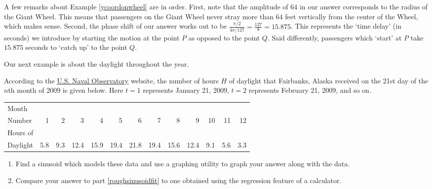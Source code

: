 A few remarks about Example \ref{ycoordonwheel} are in order.  First, note that the amplitude of $64$ in our answer corresponds to the radius of the Giant Wheel.  This means that passengers on the Giant Wheel never stray more than $64$ feet vertically from the center of the Wheel, which makes sense.  Second, the phase shift of our answer works out to be $\frac{\pi/2}{4\pi/127} = \frac{127}{8} = 15.875$.  This represents the `time delay' (in seconds) we introduce by starting the motion at the point $P$ as opposed to the point $Q$.  Said differently, passengers which `start' at $P$ take  $15.875$ seconds to `catch up' to the point $Q$.  

\medskip

Our next example is about the daylight throughout the year.

\begin{ex} \label{sinusoidsunlight} According to the \href{http://aa.usno.navy.mil/data/docs/RS_OneYear.php}{\underline{U.S. Naval Observatory}} website, the number of hours $H$ of daylight that Fairbanks, Alaska received on the 21st day of the $n$th month of 2009 is given below.  Here  $t = 1$ represents January 21, 2009, $t = 2$ represents February 21, 2009, and so on.  

\medskip

\small

\noindent \begin{tabular}{|l|r|r|r|r|r|r|r|r|r|r|r|r|} \hline
Month  & & & & & & & & & & & & \\
Number & 1 & 2 & 3 & 4 & 5 & 6 & 7 & 8 & 9 & 10 & 11 & 12\\ 
\hline 
Hours of  & & & & & & & & & & & & \\
Daylight & 5.8 & 9.3 & 12.4 & 15.9 & 19.4 & 21.8 & 19.4 & 15.6 & 12.4 & 9.1 & 5.6 & 3.3 \\ \hline
\end{tabular}

\normalsize

\medskip

\begin{enumerate}

\item  \label{roughsinusoidfit} Find a sinusoid which models these data and use a graphing utility to graph your answer along with the data. 

\item   Compare your answer to part \ref{roughsinusoidfit} to one obtained using the regression feature of a calculator.


\end{enumerate}
\end{ex}
